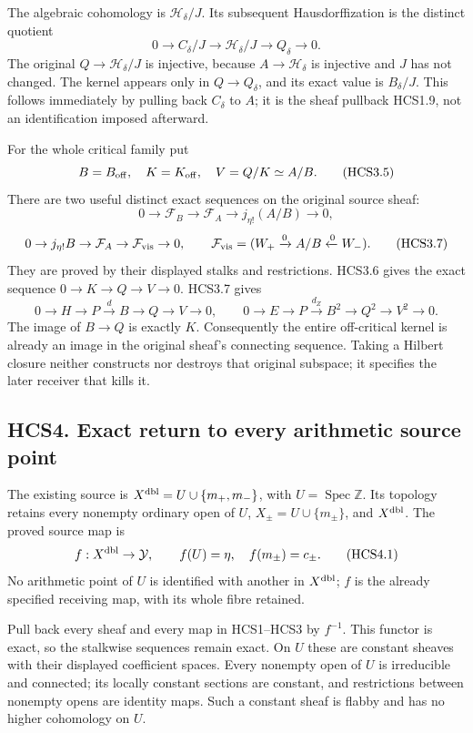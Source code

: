 The algebraic cohomology is \(\mathcal H_\delta/J\). Its subsequent
Hausdorffization is the distinct quotient \[
0\to C_\delta/J\to\mathcal H_\delta/J\to Q_\delta\to0.
\tag{HCS3.4}
\] The original \(Q\to\mathcal H_\delta/J\) is injective, because
\(A\to\mathcal H_\delta\) is injective and \(J\) has not changed. The
kernel appears only in \(Q\to Q_\delta\), and its exact value is
\(B_\delta/J\). This follows immediately by pulling back \(C_\delta\) to
\(A\); it is the sheaf pullback HCS1.9, not an identification imposed
afterward.

For the whole critical family put \[
B=B_{\rm off},\quad K=K_{\rm off},\quad V=Q/K\simeq A/B.
\tag{HCS3.5}
\] There are two useful distinct exact sequences on the original source
sheaf: \[
0\to\mathcal F_B\to\mathcal F_A\to j_{\eta!}(A/B)\to0,
\tag{HCS3.6}
\] \[
0\to j_{\eta!}B\to\mathcal F_A\to
\mathcal F_{\rm vis}\to0,\qquad
\mathcal F_{\rm vis}=(W_+\xrightarrow0A/B\xleftarrow0W_-).
\tag{HCS3.7}
\] They are proved by their displayed stalks and restrictions. HCS3.6
gives the exact sequence \(0\to K\to Q\to V\to0\). HCS3.7 gives \[
0\to H\to P\xrightarrow d B\to Q\to V\to0,
\qquad
0\to E\to P\xrightarrow{d_Z}B^2\to Q^2\to V^2\to0.
\tag{HCS3.8}
\] The image of \(B\to Q\) is exactly \(K\). Consequently the entire
off-critical kernel is already an image in the original sheaf's
connecting sequence. Taking a Hilbert closure neither constructs nor
destroys that original subspace; it specifies the later receiver that
kills it.

\subsection{HCS4. Exact return to every arithmetic source
point}\label{hcs4.-exact-return-to-every-arithmetic-source-point}

The existing source is \(X^{\rm dbl}=U\cup\{m_+,m_-\}\), with
\(U=\operatorname{Spec}\mathbb Z\). Its topology retains every nonempty
ordinary open of \(U\), \(X_\pm=U\cup\{m_\pm\}\), and \(X^{\rm dbl}\).
The proved source map is \[
f:X^{\rm dbl}\to\mathcal Y,\qquad
f(U)=\eta,\quad f(m_\pm)=c_\pm.
\tag{HCS4.1}
\] No arithmetic point of \(U\) is identified with another in
\(X^{\rm dbl}\); \(f\) is the already specified receiving map, with its
whole fibre retained.

Pull back every sheaf and every map in HCS1--HCS3 by \(f^{-1}\). This
functor is exact, so the stalkwise sequences remain exact. On \(U\)
these are constant sheaves with their displayed coefficient spaces.
Every nonempty open of \(U\) is irreducible and connected; its locally
constant sections are constant, and restrictions between nonempty opens
are identity maps. Such a constant sheaf is flabby and has no higher
cohomology on \(U\).

